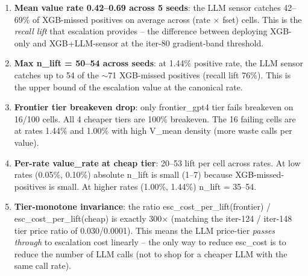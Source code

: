 \begin{enumerate}
  \item \textbf{Mean value rate 0.42--0.69 across 5 seeds}: the LLM
    sensor catches 42--69\% of XGB-missed positives on average across
    (rate $\times$ fset) cells.  This is the \emph{recall lift} that
    escalation provides -- the difference between deploying XGB-only
    and XGB+LLM-sensor at the iter-80 gradient-band threshold.

  \item \textbf{Max n\_lift = 50--54 across seeds}: at 1.44\% positive
    rate, the LLM sensor catches up to 54 of the $\sim$71 XGB-missed
    positives (recall lift 76\%).  This is the upper bound of the
    escalation value at the canonical rate.

  \item \textbf{Frontier tier breakeven drop}: only frontier\_gpt4
    tier fails breakeven on 16/100 cells.  All 4 cheaper tiers are
    100\% breakeven.  The 16 failing cells are at rates 1.44\% and
    1.00\% with high V\_mean density (more waste calls per value).

  \item \textbf{Per-rate value\_rate at cheap tier}: 20--53 lift per
    cell across rates.  At low rates (0.05\%, 0.10\%) absolute n\_lift
    is small (1--7) because XGB-missed-positives is small.  At higher
    rates (1.00\%, 1.44\%) n\_lift = 35--54.

  \item \textbf{Tier-monotone invariance}: the ratio
    esc\_cost\_per\_lift(frontier) / esc\_cost\_per\_lift(cheap) is
    exactly 300$\times$ (matching the iter-124 / iter-148 tier price
    ratio of 0.030/0.0001).  This means the LLM price-tier
    \emph{passes through} to escalation cost linearly -- the only way
    to reduce esc\_cost is to reduce the number of LLM calls (not to
    shop for a cheaper LLM with the same call rate).
\end{enumerate}

